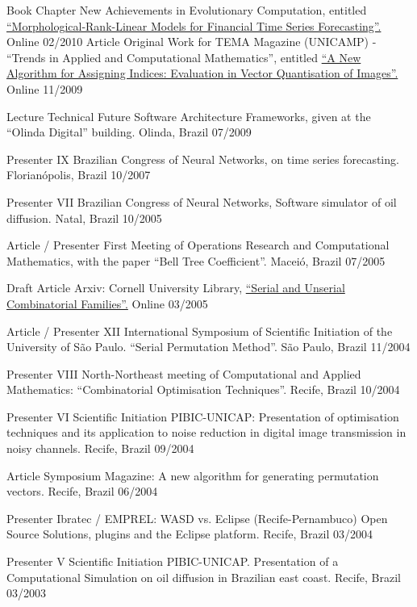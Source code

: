 \begin{cvhonors}

  \cvhonor
    {Book Chapter}
    {New Achievements in Evolutionary Computation, entitled \href{http://www.intechopen.com/books/new-achievements-in-evolutionary-computation/morphological-rank-linear-models-for-financial-time-series-forecasting}{``Morphological-Rank-Linear Models for Financial Time Series Forecasting''.}}
    {Online}
    {02/2010}
  \cvhonor
    {Article}
    {Original Work for TEMA Magazine (UNICAMP) - ``Trends in Applied and Computational Mathematics'', entitled \href{https://tema.sbmac.org.br/tema/article/view/134/75}{``A New Algorithm for Assigning Indices: Evaluation in Vector Quantisation of Images''.}}
    {Online}
    {11/2009}

   \cvhonor
   {Lecture}
   {Technical Future Software Architecture Frameworks, given at the ``Olinda Digital'' building.}
   {Olinda, Brazil}
   {07/2009}

   \cvhonor
   {Presenter}
   {IX Brazilian Congress of Neural Networks, on time series forecasting.}
   {Florianópolis, Brazil}
   {10/2007}

   \cvhonor
   {Presenter}
   {VII Brazilian Congress of Neural Networks, Software simulator of oil diffusion.}
   {Natal, Brazil}
   {10/2005}

   \cvhonor
   {Article / Presenter}
   {First Meeting of Operations Research and Computational Mathematics, with the paper ``Bell Tree Coefficient''.}
   {Maceió, Brazil}
   {07/2005}

   \cvhonor
   {Draft Article}
   {Arxiv: Cornell University Library, \href{http://arxiv.org/pdf/math/0503335v1.pdf}{``Serial and Unserial Combinatorial Families''.}}
   {Online}
   {03/2005}

   \cvhonor
   {Article / Presenter}
   {XII International Symposium of Scientific Initiation of the University of São Paulo. ``Serial Permutation Method''.}
   {São Paulo, Brazil}
   {11/2004}

   \cvhonor
   {Presenter}
   {VIII North-Northeast meeting of Computational and Applied Mathematics: ``Combinatorial Optimisation Techniques''.}
   {Recife, Brazil}
   {10/2004}

   \cvhonor
   {Presenter}
   {VI Scientific Initiation PIBIC-UNICAP: Presentation of optimisation techniques and its application to noise reduction in digital image transmission in noisy channels.}
   {Recife, Brazil}
   {09/2004}

   \cvhonor
   {Article}
   {Symposium Magazine: A new algorithm for generating permutation vectors.}
   {Recife, Brazil}
   {06/2004}

   \cvhonor
   {Presenter}
   {Ibratec / EMPREL: WASD vs. Eclipse (Recife-Pernambuco) Open Source Solutions, plugins and the Eclipse platform.}
   {Recife, Brazil}
   {03/2004}

   \cvhonor
   {Presenter}
   {V Scientific Initiation PIBIC-UNICAP. Presentation of a Computational Simulation on oil diffusion in Brazilian east coast.}
   {Recife, Brazil}
   {03/2003}

\end{cvhonors}
